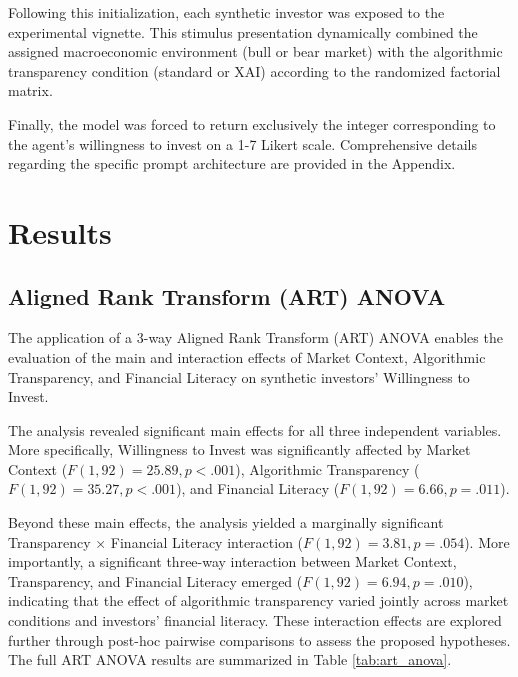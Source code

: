 \documentclass[10pt, a4paper]{article} %
\begin{document}
Following this initialization, each synthetic investor was exposed to the experimental vignette. This stimulus presentation dynamically combined the assigned macroeconomic environment (bull or bear market) with the algorithmic transparency condition (standard or XAI) according to the randomized factorial matrix. 

Finally, the model was forced to return exclusively the integer corresponding to the agent's willingness to invest on a 1-7 Likert scale. Comprehensive details regarding the specific prompt architecture are provided in the Appendix.

\newpage

\section{Results}

\subsection{Aligned Rank Transform (ART) ANOVA}

The application of a 3-way Aligned Rank Transform (ART) ANOVA enables the evaluation of the main and interaction effects of Market Context, Algorithmic Transparency, and Financial Literacy on synthetic investors' Willingness to Invest.

The analysis revealed significant main effects for all three independent variables. More specifically, Willingness to Invest was significantly affected by Market Context ($F(1,92)=25.89, p<.001$), Algorithmic Transparency ($F(1,92)=35.27, p<.001$), and Financial Literacy ($F(1,92)=6.66, p=.011$).

Beyond these main effects, the analysis yielded a marginally significant Transparency × Financial Literacy interaction ($F(1,92)=3.81, p=.054$). More importantly, a significant three-way interaction between Market Context, Transparency, and Financial Literacy emerged ($F(1,92)=6.94, p=.010$), indicating that the effect of algorithmic transparency varied jointly across market conditions and investors' financial literacy. These interaction effects are explored further through post-hoc pairwise comparisons to assess the proposed hypotheses. The full ART ANOVA results are summarized in Table \ref{tab:art_anova}.
\end{document}
